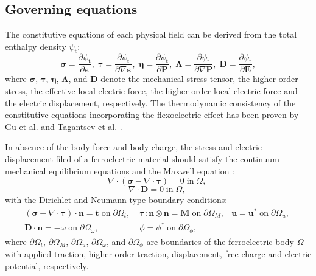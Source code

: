 \documentclass[final,times,fleqn,11pt]{elsarticle}
\begin{document}
\subsection{Governing equations}
The constitutive equations of each physical field can be derived from the total enthalpy density $\psi_\mathrm{t}$:
\begin{equation}
    \mathbf{\sigma}=\frac{\partial \psi_\mathrm{t}}{\partial\mathbf{\varepsilon}},\; 
    \mathbf{\tau}=\frac{\partial \psi_\mathrm{t}}{\partial \nabla\mathbf{\varepsilon}},\; 
    \mathbf{\eta}=\frac{\partial\psi_\mathrm{t}}{\partial \mathbf{P}},\;
    \mathbf{\Lambda}=\frac{\partial \psi_\mathrm{t}}{\partial \nabla\mathbf{P}},\;
    \mathbf{D}=\frac{\partial \psi_\mathrm{t}}{\partial \mathbf{E}},
\end{equation}
where $\mathbf{\sigma}$, $\mathbf{\tau}$, $\mathbf{\eta}$, $ \mathbf{\Lambda}$, and $\mathbf{D}$ denote the mechanical stress tensor, the higher order stress, the effective local electric force, the higher order local electric force and the electric displacement, respectively. The thermodynamic consistency of the constitutive equations incorporating the flexoelectric effect has been proven by Gu et al. \cite{gu_flexoelectricity_2014} and Tagantsev et al. \cite{tagantsev_flexoelectric_2012}.

In absence of the body force and body charge, the stress and electric displacement filed of a ferroelectric material should satisfy the continuum mechanical equilibrium equations and the Maxwell equation \cite{chang_liu_isogeometric_2019}:
\begin{equation}\label{equilibrium}
    \nabla\cdot\left( \mathbf{\sigma}-\nabla\cdot\mathbf{\tau} \right)=0\; \mathrm{in}\; \Omega,\;  
\end{equation}
\begin{equation}\label{Maxwell}
    \nabla \cdot \mathbf{D}=0 \; \mathrm{in}\; \Omega,\;
\end{equation}
with the Dirichlet and Neumann-type boundary conditions:
\begin{equation}
    \begin{split}
         (\mathbf{\sigma}-\nabla\cdot\mathbf{\tau})\cdot \mathbf{n}=\mathbf{t} \;\mathrm{on}\; \partial\Omega_t,\; 
        & \mathbf{\tau}:\mathbf{n}\otimes \mathbf{n} = \mathbf{M} \; \mathrm{on}\; \partial \Omega_M,
        &\mathbf{u}=\mathbf{u}^*\; \mathrm{on}\; \partial\Omega_u, \;\\
         \mathbf{D}\cdot \mathbf{n}=-\omega\;\mathrm{on}\; \partial\Omega_\omega,\;
        &\phi=\phi^* \;\mathrm{on}\; \partial\Omega_\phi,
    \end{split}
\end{equation}
where $\partial\Omega_t$, $\partial\Omega_M$, $\partial\Omega_u$, $\partial\Omega_\omega$, and $\partial\Omega_\phi$ are boundaries of the ferroelectric body $\Omega$ with applied traction, higher order traction, displacement, free charge and electric potential, respectively.
\end{document}
